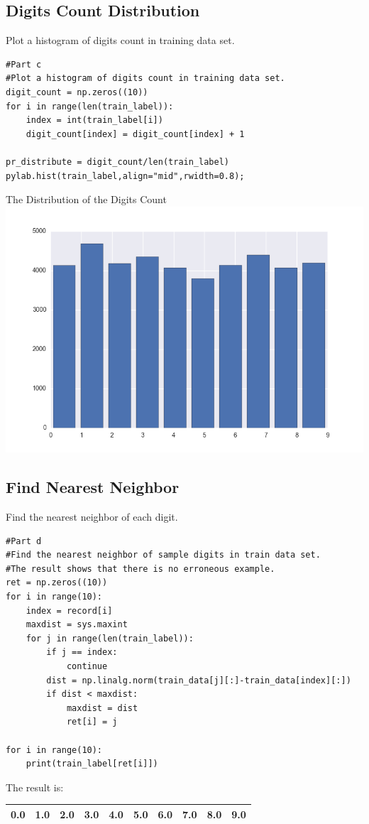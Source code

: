 \documentclass[a4paper]{article}
\begin{document}
\subsection*{Digits Count Distribution}
Plot a histogram of digits count in training data set.
\begin{lstlisting}
#Part c
#Plot a histogram of digits count in training data set.
digit_count = np.zeros((10))
for i in range(len(train_label)):
    index = int(train_label[i])
    digit_count[index] = digit_count[index] + 1

pr_distribute = digit_count/len(train_label)
pylab.hist(train_label,align="mid",rwidth=0.8);
\end{lstlisting}
\begin{center}
The Distribution of the Digits Count
\includegraphics[scale=0.63]{digit_histogram.png}
\end{center}

\subsection*{Find Nearest Neighbor}
Find the nearest neighbor of each digit.
\begin{lstlisting}
#Part d
#Find the nearest neighbor of sample digits in train data set.
#The result shows that there is no erroneous example.
ret = np.zeros((10))
for i in range(10):
    index = record[i]
    maxdist = sys.maxint
    for j in range(len(train_label)):
        if j == index:
            continue
        dist = np.linalg.norm(train_data[j][:]-train_data[index][:])
        if dist < maxdist:
            maxdist = dist
            ret[i] = j
            
for i in range(10):
    print(train_label[ret[i]])
\end{lstlisting}
The result is:
\begin{center}
\begin{tabular}{llllllllll}
\hline
	0.0 & 1.0 & 2.0 & 3.0 & 4.0 & 5.0 & 6.0 & 7.0 & 8.0 & 9.0 \\
\hline
\end{tabular}
\end{center}
\end{document}
